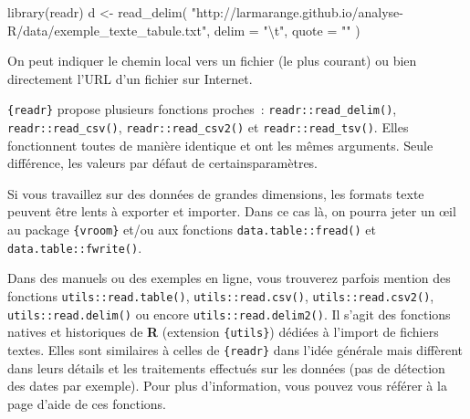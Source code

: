 \documentclass[
  letterpaper,
  DIV=11,
  numbers=noendperiod,
  oneside]{scrreprt}
\newenvironment{Shaded}{\begin{snugshade}}{\end{snugshade}}
\newcommand{\AttributeTok}[1]{\textcolor[rgb]{0.40,0.45,0.13}{#1}}
\newcommand{\FunctionTok}[1]{\textcolor[rgb]{0.28,0.35,0.67}{#1}}
\newcommand{\NormalTok}[1]{\textcolor[rgb]{0.00,0.23,0.31}{#1}}
\newcommand{\OtherTok}[1]{\textcolor[rgb]{0.00,0.23,0.31}{#1}}
\newcommand{\SpecialCharTok}[1]{\textcolor[rgb]{0.37,0.37,0.37}{#1}}
\newcommand{\StringTok}[1]{\textcolor[rgb]{0.13,0.47,0.30}{#1}}
\begin{document}
\begin{Shaded}
\begin{Highlighting}[]
\FunctionTok{library}\NormalTok{(readr)}
\NormalTok{d }\OtherTok{\textless{}{-}} \FunctionTok{read\_delim}\NormalTok{(}
  \StringTok{"http://larmarange.github.io/analyse{-}R/data/exemple\_texte\_tabule.txt"}\NormalTok{, }
  \AttributeTok{delim =} \StringTok{"}\SpecialCharTok{\textbackslash{}t}\StringTok{"}\NormalTok{, }
  \AttributeTok{quote =} \StringTok{"\textquotesingle{}"}
\NormalTok{)}
\end{Highlighting}
\end{Shaded}

On peut indiquer le chemin local vers un fichier (le plus courant) ou
bien directement l'URL d'un fichier sur Internet.

\texttt{\{readr\}} propose plusieurs fonctions proches~:
\texttt{readr::read\_delim()}, \texttt{readr::read\_csv()},
\texttt{readr::read\_csv2()} et \texttt{readr::read\_tsv()}. Elles
fonctionnent toutes de manière identique et ont les mêmes arguments.
Seule différence, les valeurs par défaut de certainsparamètres.

\begin{tcolorbox}[enhanced jigsaw, colbacktitle=quarto-callout-tip-color!10!white, opacityback=0, toprule=.15mm, colback=white, coltitle=black, bottomtitle=1mm, toptitle=1mm, titlerule=0mm, rightrule=.15mm, title=\textcolor{quarto-callout-tip-color}{\faLightbulb}\hspace{0.5em}{Fichiers de très grande taille}, breakable, bottomrule=.15mm, opacitybacktitle=0.6, arc=.35mm, left=2mm, leftrule=.75mm, colframe=quarto-callout-tip-color-frame]

Si vous travaillez sur des données de grandes dimensions, les formats
texte peuvent être lents à exporter et importer. Dans ce cas là, on
pourra jeter un œil au package \texttt{\{vroom\}} et/ou aux fonctions
\texttt{data.table::fread()} et \texttt{data.table::fwrite()}.

\end{tcolorbox}

Dans des manuels ou des exemples en ligne, vous trouverez parfois
mention des fonctions \texttt{utils::read.table()},
\texttt{utils::read.csv()}, \texttt{utils::read.csv2()},
\texttt{utils::read.delim()} ou encore \texttt{utils::read.delim2()}. Il
s'agit des fonctions natives et historiques de \textbf{R} (extension
\texttt{\{utils\}}) dédiées à l'import de fichiers textes. Elles sont
similaires à celles de \texttt{\{readr\}} dans l'idée générale mais
diffèrent dans leurs détails et les traitements effectués sur les
données (pas de détection des dates par exemple). Pour plus
d'information, vous pouvez vous référer à la page d'aide de ces
fonctions.
\end{document}
